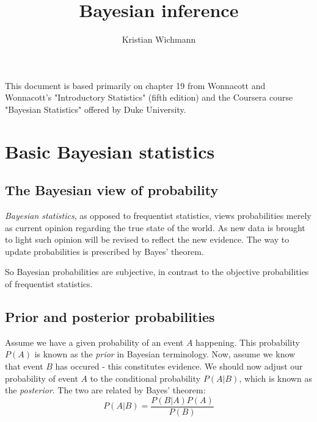 \documentclass[12pt, a4paper]{article}
\title{Bayesian inference}
\author{Kristian Wichmann}
\begin{document}
\maketitle

This document is based primarily on chapter 19 from Wonnacott and Wonnacott's "Introductory Statistics" (fifth edition) and the Coursera course "Bayesian Statistics" offered by Duke University.

\section{Basic Bayesian statistics}

\subsection{The Bayesian view of probability}

\textit{Bayesian statistics}, as opposed to frequentist statistics, views probabilities merely as current opinion regarding the true state of the world. As new data is brought to light such opinion will be revised to reflect the new evidence. The way to update probabilities is prescribed by Bayes' theorem.\par
So Bayesian probabilities are subjective, in contrast to the objective probabilities of frequentist statistics.

\subsection{Prior and posterior probabilities}
Assume we have a given probability of an event $A$ happening. This probability $P(A)$ is known as the \textit{prior} in Bayesian terminology. Now, assume we know that event $B$ has occured - this constitutes evidence. We should now adjust our probability of event $A$ to the conditional probability $P(A|B)$, which is known as the \textit{posterior}. The two are related by Bayes' theorem:
\begin{equation}
\label{bayes}
P(A|B)=\frac{P(B|A)P(A)}{P(B)}
\end{equation}
\end{document}
